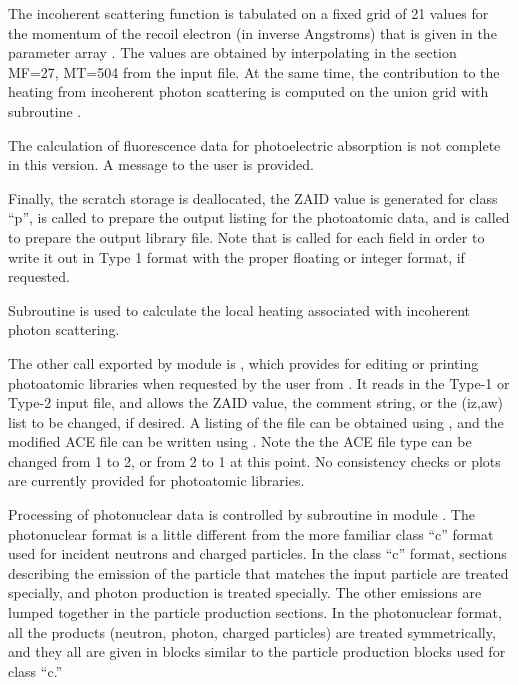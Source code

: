 The incoherent scattering function is tabulated on a fixed grid of 21
values for the momentum of the recoil electron (in inverse Angstroms)
that is given in the parameter array .  The values are
obtained by interpolating in the section MF=27, MT=504 from the input
file.  At the same time, the contribution to the heating from
incoherent photon scattering is computed on the union grid with
subroutine .

The calculation of fluorescence data for photoelectric absorption is
not complete in this version.  A message to the user is provided.

Finally, the scratch storage is deallocated, the ZAID value is
generated for class ``p'', 
is called to prepare the output listing for the photoatomic data,
and  is called to
prepare the output library file.  Note that 
is called for each field in order to write it out in Type 1 format
with the proper floating or integer format, if requested.

Subroutine 
is used to calculate the local heating
associated with incoherent photon scattering.

The other call exported by module  is
, which provides
for editing or printing photoatomic libraries when
requested by the user from .  It reads in the Type-1
or Type-2 input file, and allows the ZAID value, the comment
string, or the (iz,aw) list to be changed, if desired.  A listing
of the file can be obtained using , and the modified
ACE file can be written using .  Note the the ACE
file type can be changed from 1 to 2, or from 2 to 1 at this point.
No consistency checks or plots are currently provided for photoatomic
libraries.

Processing of photonuclear data is controlled by subroutine
 in module
.  The photonuclear format
is a little different from the more familiar class ``c'' format used
for incident neutrons and charged particles.  In the class ``c''
format, sections describing the emission of the particle that matches
the input particle are treated specially, and photon production is
treated specially.  The other emissions are lumped together in
the particle production sections.  In the photonuclear format, all
the products (neutron, photon, charged particles) are treated
symmetrically, and they all are given in blocks similar to the
particle production blocks used for class ``c.''

